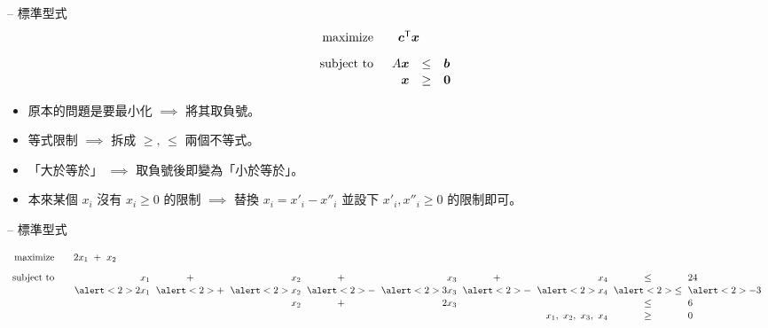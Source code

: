 \documentclass[standalone]{beamer}
\begin{document}
\begin{frame}{{\secname} -- 標準型式}
\[
\linearprog{\bm{c}^\mathsf{T} \bm{x}}{
  \begin{array}[t]{rcl}
    A\bm{x} & \leq & \bm{b} \\
    \bm{x}  & \geq & \bm{0}
  \end{array}
}
\]
\pause
\begin{itemize}
  \item<+-> 原本的問題是要最小化 $\implies$ 將其取負號。 
  \item<+-> 等式限制 $\implies$ 拆成 $\geq,\, \leq$ 兩個不等式。
  \item<+-> 「大於等於」 $\implies$ 取負號後即變為「小於等於」。
  \item<+-| alert@+> 本來某個 $x_i$ 沒有 $x_i \geq 0$ 的限制 $\implies$ 替換 $x_i = x'_i - x''_i$
    並設下 $x'_i, x''_i \geq 0$ 的限制即可。
\end{itemize}
\end{frame}

\begin{frame}{{\secname} -- 標準型式}
\begin{overlayarea}{\textwidth}{3cm}
   {
    \[
      \linearprog{2x_1 \ + \ x_2}{
        {
          \arraycolsep=3pt
          \begin{array}[t]{*4{rc}l}
            x_1 & + & x_2 & + & x_3 & + & x_4 & \leq & 24 \\
            \phantom{-}\alert<2>{2x_1} & \alert<2>{+} & \alert<2>{x_2} & \alert<2>{-} &
            \alert<2>{3x_3} & \alert<2>{-} & \alert<2>{x_4} & \alert<2>{\leq} & \alert<2>{-3} \\
            &   & x_2 & + & 2x_3 &   & & \leq & 6 \\
            \multicolumn{7}{r}{x_1,\ x_2,\ x_3,\ x_4} & \geq & 0 \\
          \end{array}
        }
      }
    \]
  }
\end{overlayarea}
\end{frame}
\end{document}
